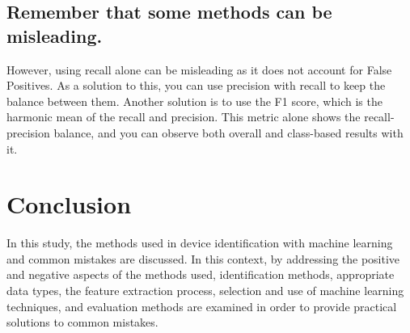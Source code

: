 \documentclass[journal]{IEEEtran}
\begin{document}
\subsection{Remember that some methods can be misleading.}
However, using recall alone can be misleading as it does not account for False Positives. As a solution to this, you can use precision with recall to keep the balance between them. Another solution is to use the F1 score, which is the harmonic mean of the recall and precision. This metric alone shows the recall-precision balance, and you can observe both overall and class-based results with it.

\section{Conclusion}
In this study, the methods used in device identification with machine learning and common mistakes are discussed. In this context, by addressing the positive and negative aspects of the methods used, identification methods, appropriate data types, the feature extraction process, selection and use of machine learning techniques, and evaluation methods are examined in order to provide practical solutions to common mistakes.






\onecolumn

\appendix \label{Appendices}
\end{document}
